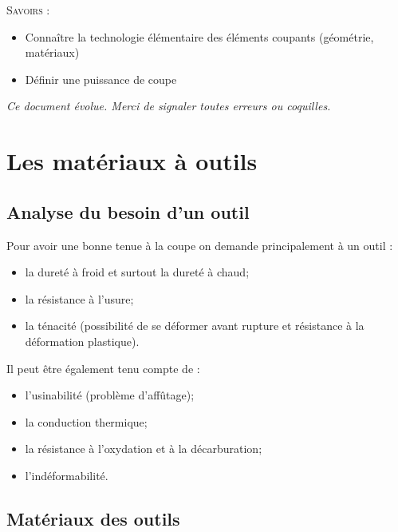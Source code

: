 \documentclass[11pt,oneside]{article}
\begin{document}
\begin{savoir}
\textsc{Savoirs :}
\begin{itemize}
\item Connaître la technologie élémentaire des éléments coupants (géométrie, matériaux)
\item Définir une puissance de coupe
\end{itemize}
\end{savoir}
 

\setlength{\parskip}{0ex plus 0.2ex minus 0ex}
 \renewcommand{\contentsname}{}
 \renewcommand{\baselinestretch}{1}

\tableofcontents

 \renewcommand{\baselinestretch}{1.2}
\setlength{\parskip}{2ex plus 0.5ex minus 0.2ex}

\textit{Ce document évolue. Merci de signaler toutes erreurs ou coquilles.}

\section{Les matériaux à outils}





\subsection{Analyse du besoin d'un outil}
Pour avoir une bonne tenue à la coupe on demande principalement à un outil : 
\begin{itemize}
\item la dureté à froid et surtout la dureté à chaud;
\item la résistance à l'usure;
\item la ténacité (possibilité de se déformer avant rupture et résistance à la déformation plastique).
\end{itemize}

Il peut être également tenu compte de :
\begin{itemize}
\item l'usinabilité (problème d'affûtage);
\item la conduction thermique;
\item la résistance à l'oxydation et à la décarburation;
\item l'indéformabilité.
\end{itemize}

\subsection{Matériaux des outils}
\end{document}
